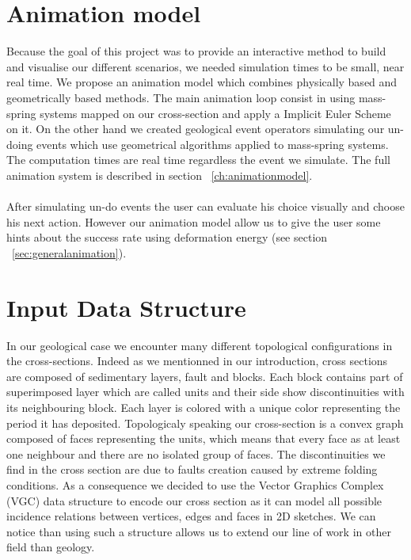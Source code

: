 \documentclass[12pt, a4paper]{report} %
\begin{document}
\section{Animation model}
Because the goal of this project was to provide an interactive method to build and visualise our different scenarios, we needed simulation times to be small, near real time. We propose an animation model which combines physically based and geometrically based methods. The main animation loop consist in using mass-spring systems mapped on our cross-section and apply a Implicit Euler Scheme on it. On the other hand we created geological event operators simulating our un-doing events which use geometrical algorithms applied to mass-spring systems. The computation times are real time regardless the event we simulate. The full animation system is described in section ~\ref{ch:animationmodel}.\\\\
After simulating un-do events the user can evaluate his choice visually and choose his next action. However our animation model allow us to give the user some hints about the success rate using deformation energy (see section ~\ref{sec:generalanimation}).
\section{Input Data Structure}
In our geological case we encounter many different topological configurations in the cross-sections. Indeed as we mentionned in our introduction, cross sections are composed of sedimentary layers, fault and blocks. Each block contains part of superimposed layer which are called units and their side show discontinuities with its neighbouring block. Each layer is colored with a unique color representing the period it has deposited. Topologicaly speaking our cross-section is a convex graph composed of faces representing the units, which means that every face as at least one neighbour and there are no isolated group of faces. The discontinuities we find in the cross section are due to faults creation caused by extreme folding conditions. As a consequence we decided to use the Vector Graphics Complex (VGC) \cite{vgc} data structure to encode our cross section as it can model all possible incidence relations between vertices, edges and faces in 2D sketches. We can notice than using such a structure allows us to extend our line of work in other field than geology.
\end{document}
